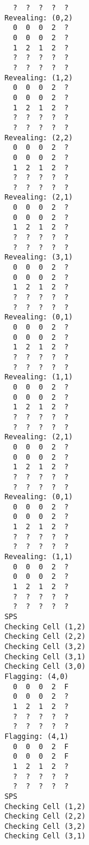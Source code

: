 \documentclass[british]{article}
\begin{document}
\begin{lstlisting}
                 ?  ?  ?  ?  ?
               Revealing: (0,2)
                 0  0  0  2  ?
                 0  0  0  2  ?
                 1  2  1  2  ?
                 ?  ?  ?  ?  ?
                 ?  ?  ?  ?  ?
               Revealing: (1,2)
                 0  0  0  2  ?
                 0  0  0  2  ?
                 1  2  1  2  ?
                 ?  ?  ?  ?  ?
                 ?  ?  ?  ?  ?
               Revealing: (2,2)
                 0  0  0  2  ?
                 0  0  0  2  ?
                 1  2  1  2  ?
                 ?  ?  ?  ?  ?
                 ?  ?  ?  ?  ?
               Revealing: (2,1)
                 0  0  0  2  ?
                 0  0  0  2  ?
                 1  2  1  2  ?
                 ?  ?  ?  ?  ?
                 ?  ?  ?  ?  ?
               Revealing: (3,1)
                 0  0  0  2  ?
                 0  0  0  2  ?
                 1  2  1  2  ?
                 ?  ?  ?  ?  ?
                 ?  ?  ?  ?  ?
               Revealing: (0,1)
                 0  0  0  2  ?
                 0  0  0  2  ?
                 1  2  1  2  ?
                 ?  ?  ?  ?  ?
                 ?  ?  ?  ?  ?
               Revealing: (1,1)
                 0  0  0  2  ?
                 0  0  0  2  ?
                 1  2  1  2  ?
                 ?  ?  ?  ?  ?
                 ?  ?  ?  ?  ?
               Revealing: (2,1)
                 0  0  0  2  ?
                 0  0  0  2  ?
                 1  2  1  2  ?
                 ?  ?  ?  ?  ?
                 ?  ?  ?  ?  ?
               Revealing: (0,1)
                 0  0  0  2  ?
                 0  0  0  2  ?
                 1  2  1  2  ?
                 ?  ?  ?  ?  ?
                 ?  ?  ?  ?  ?
               Revealing: (1,1)
                 0  0  0  2  ?
                 0  0  0  2  ?
                 1  2  1  2  ?
                 ?  ?  ?  ?  ?
                 ?  ?  ?  ?  ?
               SPS
               Checking Cell (1,2)
               Checking Cell (2,2)
               Checking Cell (3,2)
               Checking Cell (3,1)
               Checking Cell (3,0)
               Flagging: (4,0)
                 0  0  0  2  F
                 0  0  0  2  ?
                 1  2  1  2  ?
                 ?  ?  ?  ?  ?
                 ?  ?  ?  ?  ?
               Flagging: (4,1)
                 0  0  0  2  F
                 0  0  0  2  F
                 1  2  1  2  ?
                 ?  ?  ?  ?  ?
                 ?  ?  ?  ?  ?
               SPS
               Checking Cell (1,2)
               Checking Cell (2,2)
               Checking Cell (3,2)
               Checking Cell (3,1)

\end{lstlisting}
\end{document}
